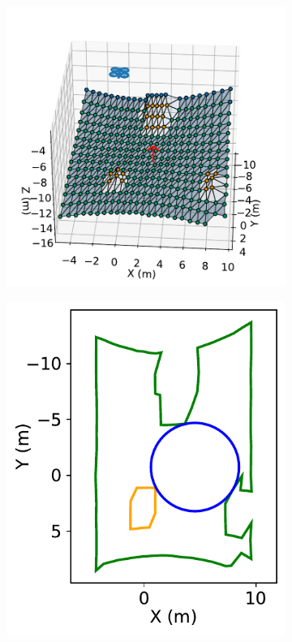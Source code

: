 \begin{figure}[ht]
 \centering
 \begin{subfigure}[t]{.45\linewidth}
    \centering\includegraphics[clip, trim=0cm 0cm 1.25cm 0.5cm, width=.99\linewidth]{chapter_6_landingsim/figs/Algorithm_mesh.pdf}
    \caption{\label{fig:ch6_semantic_pl3d_a}}
  \end{subfigure}
  \begin{subfigure}[t]{.34\linewidth}
    \centering\includegraphics[page=1, width=.99\linewidth]{chapter_6_landingsim/figs/Algorithm_polygon.pdf}

\end{subfigure}
\end{figure}
